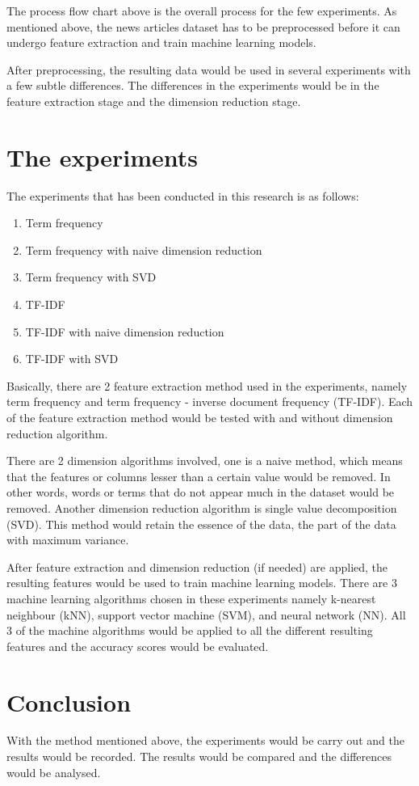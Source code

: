 The process flow chart above is the overall process for the few experiments. As mentioned above, the news articles dataset has to be preprocessed before it can undergo feature extraction and train machine learning models.

After preprocessing, the resulting data would be used in several experiments with a few subtle differences.
The differences in the experiments would be in the feature extraction stage and the dimension reduction stage. 

\section{The experiments}
The experiments that has been conducted in this research is as follows:
\begin{enumerate}
	\item Term frequency
	\item Term frequency with naive dimension reduction
	\item Term frequency with SVD
	\item TF-IDF
	\item TF-IDF with naive dimension reduction
	\item TF-IDF with SVD
\end{enumerate}

Basically, there are 2 feature extraction method used in the experiments, namely term frequency and term frequency - inverse document frequency (TF-IDF). Each of the feature extraction method would be tested with and without dimension reduction algorithm.

There are 2 dimension algorithms involved, one is a naive method, which means that the features or columns lesser than a certain value would be removed. In other words, words or terms that do not appear much in the dataset would be removed. Another dimension reduction algorithm is single value decomposition (SVD). This method would retain the essence of the data, the part of the data with maximum variance. 

After feature extraction and dimension reduction (if needed) are applied, the resulting features would be used to train machine learning models. There are 3 machine learning algorithms chosen in these experiments namely k-nearest neighbour (kNN), support vector machine (SVM), and neural network (NN). All 3 of the machine algorithms would be applied to all the different resulting features and the accuracy scores would be evaluated.


\section{Conclusion}
With the method mentioned above, the experiments would be carry out and the results would be recorded. The results would be compared and the differences would be analysed.